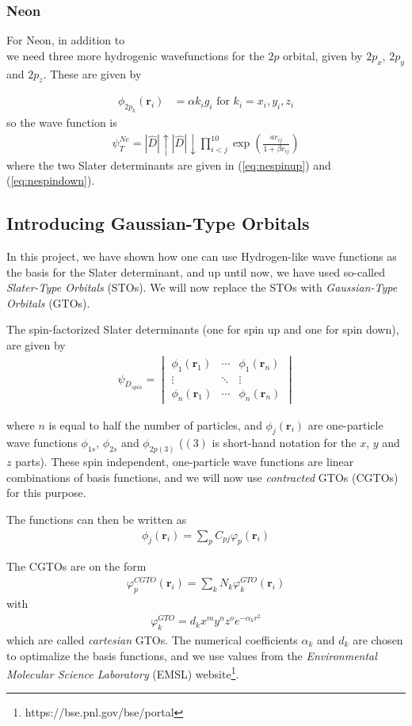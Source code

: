 \documentclass[twocolumns, a4paper,11pt,fleqn]{extarticle}
\newcommand{\eq}[1]{{\small\begin{align*}#1\end{align*}}}
\newcommand{\vmat}[1]{\begin{vmatrix}#1\end{vmatrix}}
\renewcommand\vec[1]{\boldsymbol{\mathbf{#1}}}
\newcommand{\op}[1]{\hat{#1}}
\begin{document}
\subsubsection{Neon}
For Neon, in addition to $$ $$ we need three more hydrogenic wavefunctions for the $2p$ orbital, given by
$2p_x$, $2p_y$ and $2p_z$. These are given by

\eq{
  \phi_{2p_k}(\vec r_i) &= \alpha k_i g_i \text{ for } k_i = x_i,y_i,z_i
}
so the wave function is
\eq{
  \psi_T^{Ne} = |\op D|\uparrow|\op D|\downarrow
  \prod_{i<j}^{10}\exp{\left(\frac{a r_{ij}}{1+\beta r_{ij}}\right)}
}
where the two Slater determinants are given in (\ref{eq:nespinup})
and (\ref{eq:nespindown}).

\subsection{Introducing Gaussian-Type Orbitals}
In this project, we have shown how one can use Hydrogen-like wave functions as the basis
for the Slater determinant, and up until now, 
we have used so-called \textit{Slater-Type Orbitals} (STOs).
We will now replace the STOs with \textit{Gaussian-Type Orbitals} (GTOs).

The spin-factorized Slater determinants (one for spin up and one for spin down),
are given by
\eq{\psi_{D_{spin}} = 
  \vmat{\phi_1(\vec r_1)& \cdots & \phi_1(\vec r_n)\\
  \vdots&\ddots&\vdots\\
  \phi_n(\vec r_1)& \cdots & \phi_n(\vec r_n)}
}

where $n$ is equal to half the number of particles, 
and  $\phi_j(\vec r_i)$ are one-particle wave functions 
$\phi_{1s}$, $\phi_{2s}$ and $\phi_{2p(3)}$
($(3)$ is short-hand notation for the $x$, $y$ and $z$ parts).
These spin independent, one-particle wave functions are
linear combinations of basis functions, and we will now use \textit{contracted} GTOs
(CGTOs) for this purpose.

The functions can then be written as
\eq{\phi_j(\vec r_i) = \sum_p C_{pj} \varphi_p(\vec r_i)
}

The CGTOs are on the form
\eq{
  \varphi_p^{CGTO}(\vec r_i) = \sum_k N_k \varphi^{GTO}_k(\vec r_i)
}
with
\eq{
  \varphi^{GTO}_k = d_k x^m y^n z^o e^{-\alpha_k r^2}
}
which are called \textit{cartesian} GTOs. 
The numerical coefficients $\alpha_k$ and $d_k$ are chosen to optimalize the
basis functions, and we use values from the 
\textit{Environmental Molecular Science Laboratory} (EMSL) 
website\footnote{https://bse.pnl.gov/bse/portal}.
\end{document}
